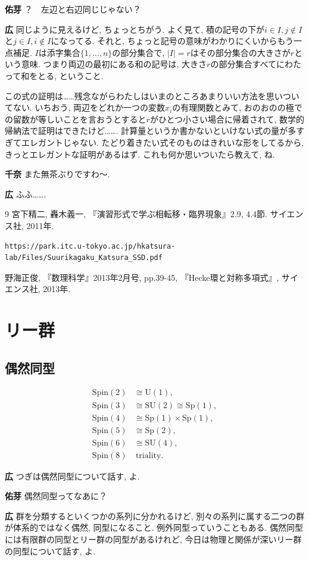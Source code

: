 \documentclass{ltjsarticle}
\theoremstyle{definition}
\newcommand{\parno}{\par\noindent}
\begin{document}
\parno
\textbf{佑芽} ？　左辺と右辺同じじゃない？\parno
\textbf{広} 同じように見えるけど, ちょっとちがう. よく見て, 積の記号の下が$i\in I,j\notin I$と$j\in I,i\notin I$になってる. それと, ちょっと記号の意味がわかりにくいからもう一点補足. $I$は添字集合$\{1,\dots,n\}$の部分集合で, $|I|=r$はその部分集合の大きさが$r$という意味. つまり両辺の最初にある和の記号は, 大きさ$r$の部分集合すべてにわたって和をとる, ということ.\par
この式の証明は……残念ながらわたしはいまのところあまりいい方法を思いついてない. いちおう, 両辺をどれか一つの変数$x_i$の有理関数とみて, おのおのの極での留数が等しいことを言おうとすると$r$がひとつ小さい場合に帰着されて, 数学的帰納法で証明はできたけど……. 計算量というか書かないといけない式の量が多すぎてエレガントじゃない. たどり着きたい式そのものはきれいな形をしてるから, きっとエレガントな証明があるはず. これも何か思いついたら教えて, ね.\parno
\textbf{千奈} また無茶ぶりですわ〜.\parno
\textbf{広} ふふ…….

\begin{thebibliography}{9}
\bibitem{} 宮下精二, 轟木義一, 『演習形式で学ぶ相転移・臨界現象』2.9, 4.4節. サイエンス社, 2011年. 
\bibitem{}
\begin{verbatim}
https://park.itc.u-tokyo.ac.jp/hkatsura-lab/Files/Suurikagaku_Katsura_SSD.pdf
\end{verbatim}
\bibitem{} 野海正俊, 『数理科学』2013年2月号, pp.39-45, 『Hecke環と対称多項式』, サイエンス社, 2013年.
\end{thebibliography}


\section{リー群}
\subsection{偶然同型\label{subsection:exceptional_isomorphism}}
\begin{tcolorbox}
  \begin{align}
    \mathrm{Spin}(2)&\cong\mathrm U(1),\\
    \mathrm{Spin}(3)&\cong\mathrm{SU}(2)\cong\mathrm{Sp}(1),\\
    \mathrm{Spin}(4)&\cong\mathrm{Sp}(1)\times\mathrm{Sp}(1),\\
    \mathrm{Spin}(5)&\cong\mathrm{Sp}(2),\\
    \mathrm{Spin}(6)&\cong\mathrm{SU}(4),\\
    \mathrm{Spin}(8)&\ \mathrm{triality}.
  \end{align}
\end{tcolorbox}
\parno
\textbf{広} つぎは偶然同型について話す, よ.\parno
\textbf{佑芽} 偶然同型ってなあに？\parno
\textbf{広} 群を分類するといくつかの系列に分かれるけど, 別々の系列に属する二つの群が体系的ではなく偶然, 同型になること. 例外同型っていうこともある. 偶然同型には有限群の同型とリー群の同型があるけれど, 今日は物理と関係が深いリー群の同型について話す, よ.
\end{document}
